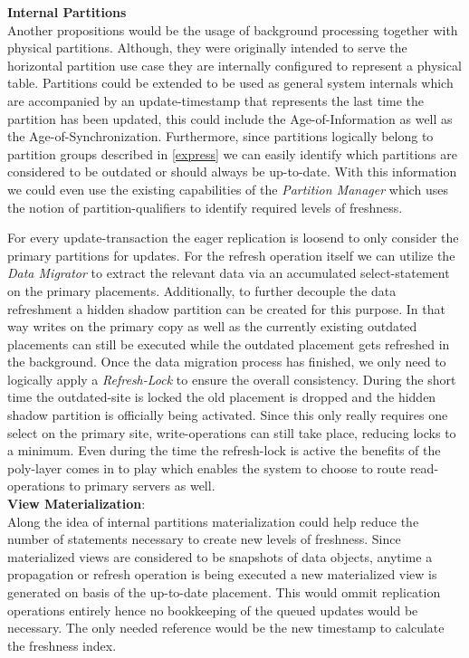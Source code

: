 \textbf{Internal Partitions} \\
Another propositions would be the usage of background processing together with physical partitions. Although, they were originally intended to serve the horizontal partition 
use case they are internally configured to represent a physical table. Partitions could be extended to be used as general system internals
which are accompanied by an update-timestamp that represents the last time the partition has been updated, this could include the Age-of-Information as well as 
the Age-of-Synchronization. Furthermore, since partitions logically belong to partition groups described in \ref{express} we can easily identify which partitions are considered to be 
outdated or should always be up-to-date. With this information we could even use the existing capabilities of the \emph{Partition Manager} which uses the notion of 
partition-qualifiers to identify required levels of freshness.

For every update-transaction the eager replication is loosend to only consider the primary partitions for updates.
For the refresh operation itself we can utilize the \emph{Data Migrator} to extract the relevant data via an accumulated select-statement on the primary placements.
Additionally, to further decouple the data refreshment a hidden shadow partition can be created for this purpose. In that way writes on the primary copy as well as the 
currently existing outdated placements can still be executed while the outdated placement gets refreshed in the background. Once the data migration process has finished, 
we only need to logically apply a \emph{Refresh-Lock} to ensure the overall consistency. During the short time the outdated-site is locked the old placement is dropped and 
the hidden shadow partition is officially being activated. Since this only really requires one select on the primary site, write-operations can still take place, reducing
locks to a minimum. Even during the time the refresh-lock is active the benefits of the poly-layer comes in to play which enables the system to choose to 
route read-operations to primary servers as well.\\


\textbf{View Materialization}:\\
Along the idea of internal partitions materialization could help reduce the number of statements necessary to create new levels of freshness.
Since materialized views are considered to be snapshots of data objects, anytime a propagation or refresh operation is being executed a new materialized view is 
generated on basis of the up-to-date placement.
This would ommit replication operations entirely hence no bookkeeping of the queued updates would be necessary. The only needed reference would be the new timestamp
to calculate the freshness index.

